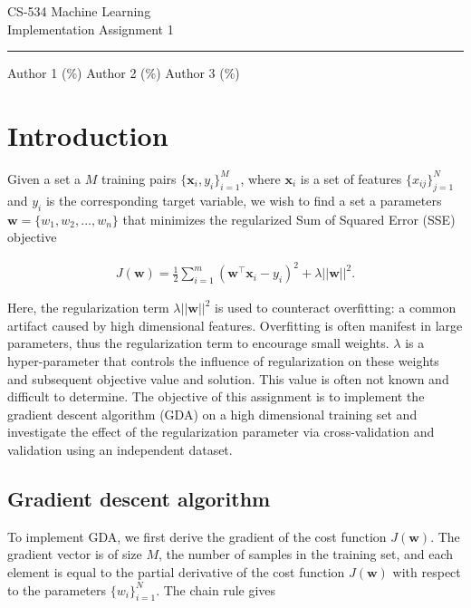 \documentclass{article}
\renewcommand{\vec}[1]{\mathbf{#1}}
\begin{document}
\begin{center}
	{\huge CS-534 Machine Learning} \\ \vspace{2mm}
	{\Large Implementation Assignment 1} \\ \vspace{2mm} \hrule \vspace{3mm}
	{\normalsize Author 1 (\%) \hspace{6mm}  Author 2 (\%) \hspace{6mm}  Author 3 (\%)} 
\end{center}

\section{Introduction}

Given a set a $M$ training pairs $\{\vec{x}_i, y_i\}^M_{i=1}$, where $\vec{x}_i$ is a set of features $\{x_{ij}\}^N_{j=1}$ and $y_i$ is the corresponding target variable, we wish to find a set a parameters $\vec{w} = \{w_1, w_2, \dots ,w_n\}$ that minimizes the regularized Sum of Squared Error (SSE) objective

\begin{align*}
	J(\vec{w}) = \frac{1}{2}\sum^{m}_{i=1}(\vec{w}^\top\vec{x}_i - y_i)^2 + \lambda||\vec{w}||^2.
\end{align*}

Here, the regularization term $\lambda||\vec{w}||^2$ is used to counteract overfitting: a common artifact caused by high dimensional features. Overfitting is often manifest in large parameters, thus the regularization term to encourage small weights. $\lambda$ is a hyper-parameter that controls the influence of regularization on these weights and subsequent objective value and solution. This value is often not known and difficult to determine. The objective of this assignment is to implement the gradient descent algorithm (GDA) on a high dimensional training set and investigate the effect of the regularization parameter via cross-validation and validation using an independent dataset.

\subsection{Gradient descent algorithm}

To implement GDA, we first derive the gradient of the cost function $J(\vec{w})$. The gradient vector is of size $M$, the number of samples in the training set, and each element is equal to the partial derivative of the cost function $J(\vec{w})$ with respect to the parameters $\{w_i\}^N_{i=1}$. The chain rule gives
\end{document}
